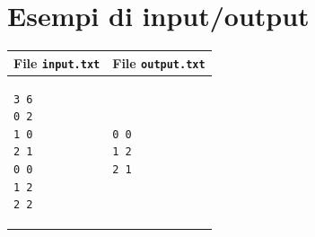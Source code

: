 \documentclass[a4paper,11pt]{article}
\begin{document}
\section*{Esempi di input/output}
    \noindent
    \begin{tabular}{p{11cm}|p{5cm}}
    \toprule
    \textbf{File \texttt{input.txt}}
    & \textbf{File \texttt{output.txt}}
    \\
    \midrule
    \scriptsize
    \begin{verbatim}
3 6
0 2
1 0
2 1
0 0
1 2
2 2
      \end{verbatim}
    &
    \scriptsize
    \begin{verbatim}
0 0
1 2
2 1
      \end{verbatim}
    \\
    \bottomrule
    \end{tabular}
\end{document}
